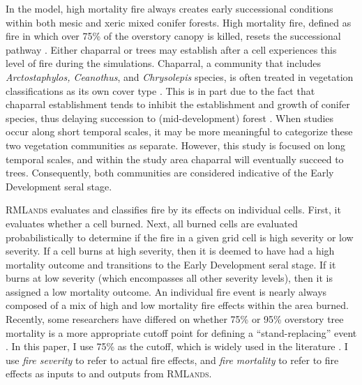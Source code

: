 In the model, high mortality fire always creates early successional conditions within both mesic and xeric mixed conifer forests. High mortality fire, defined as fire in which over 75\% of the overstory canopy is killed, resets the successional pathway \citep{Agee1993}. Either chaparral or trees may establish after a cell experiences this level of fire during the simulations. Chaparral, a community that includes \emph{Arctostaphylos, Ceanothus}, and \emph{Chrysolepis} species, is often treated in vegetation classifications as its own cover type \citep{USDAForestService2008,VandeWater2011}. This is in part due to the fact that chaparral establishment tends to inhibit the establishment and growth of conifer species, thus delaying succession to (mid-development) forest \citep{Landfire2007}. When studies occur along short temporal scales, it may be more meaningful to categorize these two vegetation communities as separate. However, this study is focused on long temporal scales, and within the study area chaparral will eventually succeed to trees. Consequently, both communities are considered indicative of the Early Development seral stage.

\textsc{RMLands} evaluates and classifies fire by its effects on individual cells. First, it evaluates whether a cell burned. Next, all burned cells are evaluated probabilistically to determine if the fire in a given grid cell is high severity or low severity. If a cell burns at high severity, then it is deemed to have had a high mortality outcome and transitions to the Early Development seral stage. If it burns at low severity (which encompasses all other severity levels), then it is assigned a low mortality outcome. An individual fire event is nearly always composed of a mix of high and low mortality fire effects within the area burned. Recently, some researchers have differed on whether 75\% or 95\% overstory tree mortality is a more appropriate cutoff point for defining a ``stand-replacing'' event \citep{Fule2014,Mallek2013}. In this paper, I use 75\% as the cutoff, which is widely used in the literature \citep{Agee1993,Agee2007,Miller2009,Baker2014}. I use \emph{fire severity} to refer to actual fire effects, and \emph{fire mortality} to refer to fire effects as inputs to and outputs from \textsc{RMLands}.



